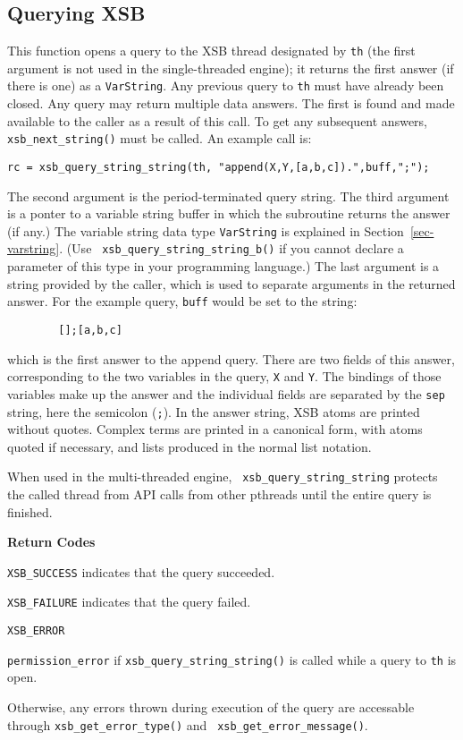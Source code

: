 \subsection{Querying XSB}

\begin{description}
  
%
This function opens a query to the XSB thread designated by {\tt th}
(the first argument is not used in the single-threaded engine); it
returns the first answer (if there is one) as a {\tt VarString}.  Any
previous query to {\tt th} must have already been closed.  Any query
may return multiple data answers.  The first is found and made
available to the caller as a result of this call.  To get any
subsequent answers, {\tt xsb\_next\_string()} must be called.  An
example call is:
\begin{verbatim}
rc = xsb_query_string_string(th, "append(X,Y,[a,b,c]).",buff,";");
\end{verbatim}
The second argument is the period-terminated query string.  The third
argument is a ponter to a variable string buffer in which the
subroutine returns the answer (if any.) The variable string data type
{\tt VarString} is explained in Section~\ref{sec-varstring}. (Use {\tt
  xsb\_query\_string\_string\_b()} if you cannot declare a parameter
of this type in your programming language.)  The last argument is a
string provided by the caller, which is used to separate arguments in
the returned answer.  For the example query, {\tt buff} would be set
to the string:
\begin{verbatim}
        [];[a,b,c]
\end{verbatim}
which is the first answer to the append query.  There are two fields
of this answer, corresponding to the two variables in the query,
\verb|X| and \verb|Y|.  The bindings of those variables make up the
answer and the individual fields are separated by the \verb|sep|
string, here the semicolon (\verb|;|).  In the answer string, XSB
atoms are printed without quotes.  Complex terms are printed in a
canonical form, with atoms quoted if necessary, and lists produced in
the normal list notation.

When used in the multi-threaded engine, {\tt
  xsb\_query\_string\_string} protects the called thread from API
calls from other pthreads until the entire query is finished.

{\bf Return Codes}  
\bi
\item {\tt XSB\_SUCCESS} indicates that the query succeeded.
%
\item {\tt XSB\_FAILURE} indicates that the query failed.
%
\item {\tt XSB\_ERROR} 
\bi
\item {\tt permission\_error} if {\tt xsb\_query\_string\_string()} is
  called while a query to {\tt th} is open.
%
\item Otherwise, any errors thrown during execution of the query are
  accessable through {\tt xsb\_get\_error\_type()} and {\tt
    xsb\_get\_error\_message()}.  
\ei 
\ei


\end{description}
